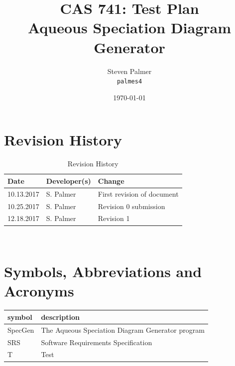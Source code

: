 \documentclass[12pt, titlepage]{article}
\newcommand{\progname}{SpecGen}
\begin{document}

\title{CAS 741: Test Plan\\[10pt]\Large Aqueous Speciation Diagram Generator}
\author{Steven Palmer\\\texttt{palmes4}}
\date{\today}
	
\maketitle


\setcounter{secnumdepth}{0}

\section{Revision History}

\begin{table}[hp]
\caption{Revision History} \label{TblRevisionHistory}
\begin{tabularx}{\textwidth}{llX}
\toprule
\textbf{Date} & \textbf{Developer(s)} & \textbf{Change}\\
\midrule
10.13.2017 & S. Palmer & First revision of document\\
10.25.2017 & S. Palmer & Revision 0 submission\\
12.18.2017 & S. Palmer & Revision 1\\
\bottomrule
\end{tabularx}
\end{table}

~\newpage


\section{Symbols, Abbreviations and Acronyms}

\renewcommand{\arraystretch}{1.2}
\begin{tabular}{l l} 
  \toprule		
  \textbf{symbol} & \textbf{description}\\
  \midrule
  \progname{} & The Aqueous Speciation Diagram Generator program\\  
  SRS & Software Requirements Specification\\
  T & Test\\
  \bottomrule
\end{tabular}\\

\newpage

\tableofcontents
\end{document}
